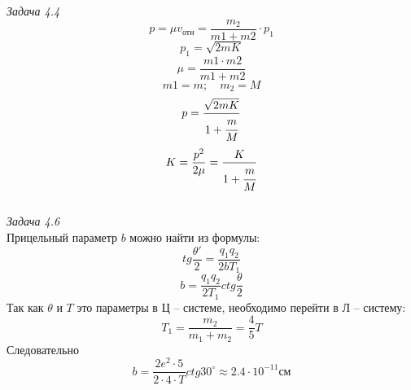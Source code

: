 	\emph{Задача 4.4}\\
		\[ p = \mu v_\text{отн} = \frac{m_2}{m1+m2}\cdot p_1 \]
		\[ p_1 = \sqrt{2mK} \]
		\[ \mu = \frac{m1\cdot m2}{m1+m2} \]
		\[ m1 = m;\quad m_2 = M \]
		\[ p = \frac{\sqrt{2mK}}{1+\cfrac{m}{M}} \]
		\[ K = \frac{p^2}{2\mu} = \frac{K}{1+\cfrac{m}{M}} \]
	\\

	\emph{Задача 4.6}\\
	Прицельный параметр \( b \) можно найти из формулы:
		\[ tg\frac{\theta'}{2} = \frac{q_1 q_2}{2bT_1} \]
		\[ b = \frac{q_1 q_2}{2T_1}ctg\frac{\theta}{2} \]
	Так как \( \theta \) и \( T \) это параметры в Ц -- системе, 
	необходимо перейти в Л -- систему:
		\[ T_1 = \frac{m_2}{m_1 + m_2} = \frac{4}{5}T \]
	Следовательно
		\[ b = \frac{2e^2\cdot 5}{2\cdot 4\cdot T}ctg{30^\circ} \approx 2.4\cdot 10^{-11} \text{см} \]

